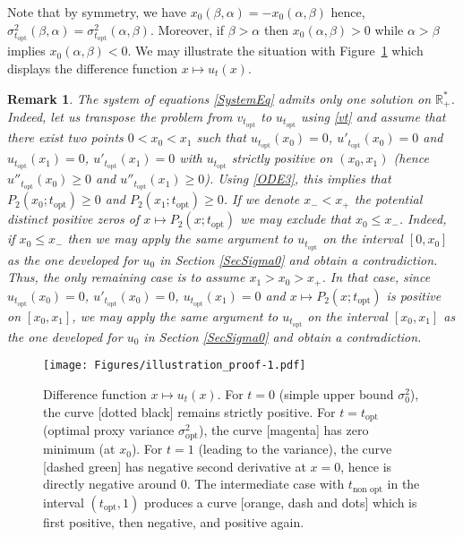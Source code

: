 \documentclass[15pt]{article}
\theoremstyle{plain}
\newtheorem{rem}{{Remark}}%
\begin{document}
\eeqq
Note that by symmetry, we have $x_0(\beta,\alpha)=-x_0(\alpha,\beta)$ hence, $\sigma^2_{t_{\text{opt}}}(\beta,\alpha)=\sigma^2_{t_{\text{opt}}}(\alpha,\beta)$. Moreover, if $\beta>\alpha$ then $x_0(\alpha,\beta)>0$ while $\alpha>\beta$ implies $x_0(\alpha,\beta)<0$. 
We may illustrate the situation with Figure~\ref{fig:proof} which displays the difference function $x\mapsto u_t(x)$. 
%
\begin{rem} The system of equations \eqref{SystemEq} admits only one solution on $\mathbb{R}_+^*$. Indeed, let us transpose the problem from $v_{t_{\text{opt}}}$ to $u_{t_{\text{opt}}}$ using \eqref{vt} and assume that there exist two points $0<x_0<x_1$ such that $u_{t_{\text{opt}}}(x_0)=0$, $u'_{t_{\text{opt}}}(x_0)=0$ and $u_{t_{\text{opt}}}(x_1)=0$, $u'_{t_{\text{opt}}}(x_1)=0$ with $u_{t_{\text{opt}}}$ strictly positive on $(x_0,x_1)$ (hence $u''_{t_{\text{opt}}}(x_0)\geq 0$ and $u''_{t_{\text{opt}}}(x_1)\geq 0$). Using \eqref{ODE3}, this implies that $P_2(x_0;t_{\text{opt}})\geq 0$ and $P_2(x_1;t_{\text{opt}})\geq 0$. If we denote $x_-<x_+$ the potential distinct positive zeros of $x\mapsto P_2(x;t_{\text{opt}})$ we may exclude that $x_0\leq x_-$. Indeed, if $x_0\leq x_-$ then we may apply the same argument to $u_{t_{\text{opt}}}$ on the interval $[0,x_0]$ as the one developed for $u_0$ in Section \ref{SecSigma0} and obtain a contradiction. Thus, the only remaining case is to assume $x_1>x_0>x_+$. In that case, since $u_{t_{\text{opt}}}(x_0)=0$, $u'_{t_{\text{opt}}}(x_0)=0$, $u_{t_{\text{opt}}}(x_1)=0$ and $x\mapsto P_2(x;t_{\text{opt}})$ is positive on $[x_0,x_1]$, we may apply the same argument to $u_{t_{\text{opt}}}$ on the interval $[x_0,x_1]$ as the one developed for $u_0$ in Section \ref{SecSigma0} and obtain a contradiction. 
\end{rem}
%
\begin{figure}
\begin{center}
\texttt{[image: Figures/illustration\_proof-1.pdf]}
\end{center}
\caption{\label{fig:proof}
Difference function $x\mapsto u_t(x)$. For $t=0$ (simple upper bound $\sigma_0^2$), the curve [dotted black] remains strictly positive. For $t=t_{\text{opt}}$ (optimal proxy variance $\sigma^2_{\text{opt}}$), the curve [magenta] has zero minimum (at $x_0$). For $t=1$ (leading to the variance), the curve [dashed green] has negative second derivative at $x=0$, hence is directly negative around 0. The intermediate case with $t_{\text{non opt}}$ in the interval $(t_{\text{opt}},1)$ produces a curve [orange, dash and dots] which is first positive, then negative, and positive again.
}
\end{figure}
\end{document}
